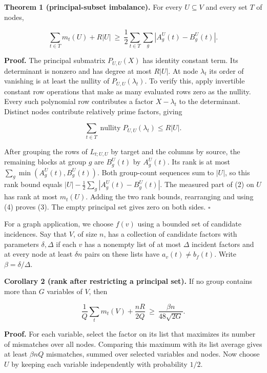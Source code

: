 \documentclass[
  10pt,
]{article}
\begin{document}
\textbf{Theorem 1 (principal-subset imbalance).} For every
\(U\subseteq V\) and every set \(T\) of nodes,

\[
 \sum_{t\in T}m_t(U)+R|U|
 \ \ge\ \frac12\sum_{t\in T}\sum_g|A_g^U(t)-B_g^U(t)|.             \tag{3}
\]

\textbf{Proof.} The principal submatrix \(P_{U,U}(X)\) has identity
constant term. Its determinant is nonzero and has degree at most
\(R|U|\). At node \(\lambda_t\) its order of vanishing is at least the
nullity of \(P_{U,U}(\lambda_t)\). To verify this, apply invertible
constant row operations that make as many evaluated rows zero as the
nullity. Every such polynomial row contributes a factor \(X-\lambda_t\)
to the determinant. Distinct nodes contribute relatively prime factors,
giving

\[
 \sum_{t\in T}\operatorname{nullity}P_{U,U}(\lambda_t)\le R|U|.      \tag{4}
\]

After grouping the rows of \(L_{t;U,U}\) by target and the columns by
source, the remaining blocks at group \(g\) are \(B_g^U(t)\) by
\(A_g^U(t)\). Its rank is at most \(\sum_g\min(A_g^U(t),B_g^U(t))\).
Both group-count sequences sum to \(|U|\), so this rank bound equals
\(|U|-\tfrac12\sum_g|A_g^U(t)-B_g^U(t)|\). The measured part of (2) on
\(U\) has rank at most \(m_t(U)\). Adding the two rank bounds,
rearranging and using (4) proves (3). The empty principal set gives zero
on both sides. \(\square\)

For a graph application, we choose \(f(v)\) using a bounded set of
candidate incidences. Say that \(V\), of size \(n\), has a collection of
candidate factors with parameters \(\delta,\Delta\) if each \(v\) has a
nonempty list of at most \(\Delta\) incident factors and at every node
at least \(\delta n\) pairs on these lists have \(a_v(t)\ne b_f(t)\).
Write \(\beta=\delta/\Delta\).

\textbf{Corollary 2 (rank after restricting a principal set).} If no
group contains more than \(G\) variables of \(V\), then

\[
 \frac1Q\sum_t m_t(V)+\frac{nR}{2Q}
    \ \ge\ \frac{\beta n}{48\sqrt{2G}} .                            \tag{5}
\]

\textbf{Proof.} For each variable, select the factor on its list that
maximizes its number of mismatches over all nodes. Comparing this
maximum with its list average gives at least \(\beta nQ\) mismatches,
summed over selected variables and nodes. Now choose \(U\) by keeping
each variable independently with probability \(1/2\).
\end{document}
